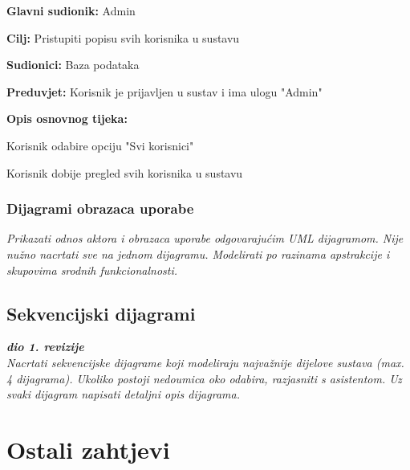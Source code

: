 					\noindent {}
					\begin{packed_item}
	
						\item \textbf{Glavni sudionik: }Admin
						\item  \textbf{Cilj:} Pristupiti popisu svih korisnika u sustavu
						\item  \textbf{Sudionici:} Baza podataka
						\item  \textbf{Preduvjet:} Korisnik je prijavljen u sustav i ima ulogu "Admin"
						\item  \textbf{Opis osnovnog tijeka:}
						
						\item[] \begin{packed_enum}
	
							\item Korisnik odabire opciju "Svi korisnici"
							\item Korisnik dobije pregled svih korisnika u sustavu
						\end{packed_enum}
					
					\end{packed_item}
						
				\subsubsection{Dijagrami obrazaca uporabe}
					
					\textit{Prikazati odnos aktora i obrazaca uporabe odgovarajućim UML dijagramom. Nije nužno nacrtati sve na jednom dijagramu. Modelirati po razinama apstrakcije i skupovima srodnih funkcionalnosti.}
				\eject		
				
			\subsection{Sekvencijski dijagrami}
				
				\textbf{\textit{dio 1. revizije}}\\
				
				\textit{Nacrtati sekvencijske dijagrame koji modeliraju najvažnije dijelove sustava (max. 4 dijagrama). Ukoliko postoji nedoumica oko odabira, razjasniti s asistentom. Uz svaki dijagram napisati detaljni opis dijagrama.}
				\eject
	
		\section{Ostali zahtjevi}
		
